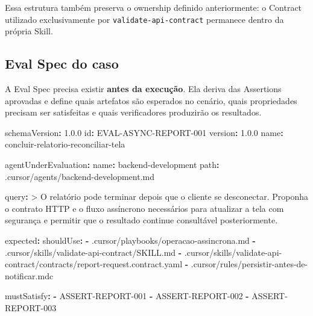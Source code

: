 \documentclass[
  10pt,
  a4paper,
  oneside]{book}
\newenvironment{Shaded}{}{}
\newcommand{\AttributeTok}[1]{\textcolor[rgb]{0.49,0.56,0.16}{#1}}
\newcommand{\CharTok}[1]{\textcolor[rgb]{0.25,0.44,0.63}{#1}}
\newcommand{\FloatTok}[1]{\textcolor[rgb]{0.25,0.63,0.44}{#1}}
\newcommand{\FunctionTok}[1]{\textcolor[rgb]{0.02,0.16,0.49}{#1}}
\newcommand{\KeywordTok}[1]{\textcolor[rgb]{0.00,0.44,0.13}{\textbf{#1}}}
\newcommand{\NormalTok}[1]{#1}
\renewenvironment{Shaded}{\begin{snugshade}}{\end{snugshade}}%
\begin{document}
Essa estrutura também preserva o ownership definido anteriormente: o
Contract utilizado exclusivamente por \texttt{validate-api-contract}
permanece dentro da própria Skill.

\hypertarget{eval-spec-do-caso}{%
\subsection{Eval Spec do caso}\label{eval-spec-do-caso}}

A Eval Spec precisa existir \textbf{antes da execução}. Ela deriva das
Assertions aprovadas e define quais artefatos são esperados no cenário,
quais propriedades precisam ser satisfeitas e quais verificadores
produzirão os resultados.

\begin{Shaded}
\begin{Highlighting}[]
\FunctionTok{schemaVersion}\KeywordTok{:}\AttributeTok{ }\FloatTok{1.0.0}
\FunctionTok{id}\KeywordTok{:}\AttributeTok{ EVAL{-}ASYNC{-}REPORT{-}001}
\FunctionTok{version}\KeywordTok{:}\AttributeTok{ }\FloatTok{1.0.0}
\FunctionTok{name}\KeywordTok{:}\AttributeTok{ concluir{-}relatorio{-}reconciliar{-}tela}

\FunctionTok{agentUnderEvaluation}\KeywordTok{:}
\AttributeTok{  }\FunctionTok{name}\KeywordTok{:}\AttributeTok{ backend{-}development}
\AttributeTok{  }\FunctionTok{path}\KeywordTok{:}\AttributeTok{ .cursor/agents/backend{-}development.md}

\FunctionTok{query}\KeywordTok{: }\CharTok{\textgreater{}}
\NormalTok{  O relatório pode terminar depois que o cliente se desconectar.}
\NormalTok{  Proponha o contrato HTTP e o fluxo assíncrono necessários para}
\NormalTok{  atualizar a tela com segurança e permitir que o resultado}
\NormalTok{  continue consultável posteriormente.}

\FunctionTok{expected}\KeywordTok{:}
\AttributeTok{  }\FunctionTok{shouldUse}\KeywordTok{:}
\AttributeTok{    }\KeywordTok{{-}}\AttributeTok{ .cursor/playbooks/operacao{-}assincrona.md}
\AttributeTok{    }\KeywordTok{{-}}\AttributeTok{ .cursor/skills/validate{-}api{-}contract/SKILL.md}
\AttributeTok{    }\KeywordTok{{-}}\AttributeTok{ .cursor/skills/validate{-}api{-}contract/contracts/report{-}request.contract.yaml}
\AttributeTok{    }\KeywordTok{{-}}\AttributeTok{ .cursor/rules/persistir{-}antes{-}de{-}notificar.mdc}

\AttributeTok{  }\FunctionTok{mustSatisfy}\KeywordTok{:}
\AttributeTok{    }\KeywordTok{{-}}\AttributeTok{ ASSERT{-}REPORT{-}001}
\AttributeTok{    }\KeywordTok{{-}}\AttributeTok{ ASSERT{-}REPORT{-}002}
\AttributeTok{    }\KeywordTok{{-}}\AttributeTok{ ASSERT{-}REPORT{-}003}


\end{Highlighting}
\end{Shaded}
\end{document}

